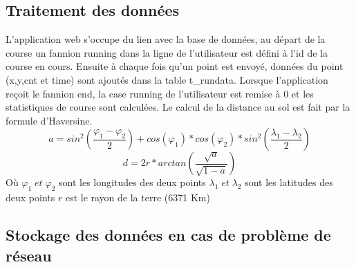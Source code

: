 \documentclass[a4paper,11pt]{article}
\begin{document}
\subsection{Traitement des données}
L'application web s'occupe du lien avec la base de données, au départ de la course un fannion running dans la ligne de l'utilisateur est défini à l'id de la course en cours.\newline
Ensuite à chaque fois qu'un point est envoyé, données du point (x,y,cnt et time) sont ajoutés dans la table t\_rundata.\newline
Lorsque l'application reçoit le fannion end, la case running de l'utilisateur est remise à 0 et les statistiques de course sont calculées.
Le calcul de la distance au sol est fait par la formule d'Haversine.
\begin{equation*}
a = sin^2(\frac{\varphi_1 - \varphi_2}{2}) + cos(\varphi_1) * cos(\varphi_2) * sin^2(\frac{\lambda_1 - \lambda_2}{2})
\end{equation*}
\begin{equation*}
d = 2r *arctan\left(\frac{\sqrt{a}}{\sqrt{1-a}}\right)
\end{equation*}
Où \newline
$\varphi_1 \; et \; \varphi_2$ sont les longitudes des deux points\newline
$\lambda_1 \; et \; \lambda_2$ sont les latitudes des deux points\newline
$r$ est le rayon de la terre (6371 Km)\newline
\subsection{Stockage des données en cas de problème de réseau}
\end{document}
